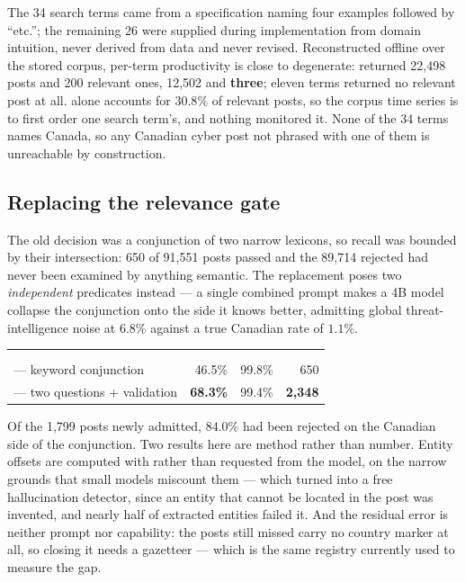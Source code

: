 \documentclass[11pt]{article}
\begin{document}
The 34 search terms came from a specification naming four examples followed by
``etc.''; the remaining 26 were supplied during implementation from domain
intuition, never derived from data and never revised. Reconstructed offline
over the stored corpus, per-term productivity is close to degenerate:
 returned 22{,}498 posts and 200 relevant ones, 
12{,}502 and \textbf{three}; eleven terms returned no relevant post at all.
 alone accounts for $30.8\%$ of relevant posts, so the
corpus time series is to first order one search term's, and nothing monitored
it. None of the 34 terms names Canada, so any Canadian cyber post not phrased
with one of them is unreachable by construction.

\subsection*{Replacing the relevance gate}

The old decision was a conjunction of two narrow lexicons, so recall was
bounded by their intersection: 650 of 91{,}551 posts passed and the 89{,}714
rejected had never been examined by anything semantic. The replacement poses
two \emph{independent} predicates instead --- a single combined prompt makes a
4B model collapse the conjunction onto the side it knows better, admitting
global threat-intelligence noise at $6.8\%$ against a true Canadian rate of
$1.1\%$.

\begin{center}\small
\begin{tabularx}{.93\linewidth}{@{}Lrrr@{}}
\toprule
{} &  &  &  \\
 &  &  &  \\
\midrule
{} --- keyword conjunction     & 46.5\% & 99.8\% & 650 \\
 --- two questions + validation & \textbf{68.3\%} & 99.4\% & \textbf{2{,}348} \\
\bottomrule
\end{tabularx}
\end{center}

Of the 1{,}799 posts newly admitted, $84.0\%$ had been rejected on the Canadian
side of the conjunction. Two results here are method rather than number. Entity
offsets are computed with  rather than requested from the model,
on the narrow grounds that small models miscount them --- which turned into a
free hallucination detector, since an entity that cannot be located in the post
was invented, and nearly half of extracted  entities failed it. And
the residual error is neither prompt nor capability: the posts still missed
carry no country marker at all, so closing it needs a gazetteer --- which is
the same registry currently used to measure the gap.
\end{document}
